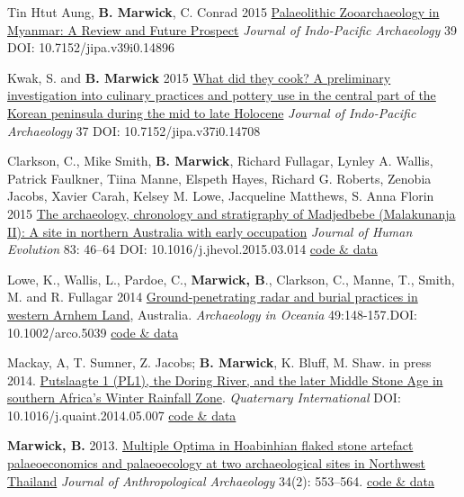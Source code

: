 \documentclass[11pt,article,oneside]{memoir}
\begin{document}
{{{{\ind Tin Htut Aung, \textbf{B. Marwick}, C. Conrad 2015 \href{https://journals.lib.washington.edu/index.php/JIPA/article/view/14896}{Palaeolithic Zooarchaeology in Myanmar: A Review and Future Prospect} \textit{Journal of Indo-Pacific Archaeology} 39 DOI: 10.7152/jipa.v39i0.14896

\ind Kwak, S. and \textbf{B. Marwick} 2015 \href{http://journals.lib.washington.edu/index.php/JIPA/article/view/14708}{What did they cook? A preliminary investigation into culinary practices and pottery use in the central part of the Korean peninsula during the mid to late Holocene} \textit{Journal of Indo-Pacific Archaeology} 37  DOI: 10.7152/jipa.v37i0.14708

\ind Clarkson, C., Mike Smith, \textbf{B. Marwick}, Richard Fullagar, Lynley A. Wallis, Patrick Faulkner, Tiina Manne, Elspeth Hayes, Richard G. Roberts, Zenobia Jacobs, Xavier Carah, Kelsey M. Lowe, Jacqueline Matthews, S. Anna Florin 2015 \href{http://www.sciencedirect.com/science/article/pii/S0047248415000846}{The archaeology, chronology and stratigraphy of Madjedbebe (Malakunanja II): A site in northern Australia with early occupation} \textit{Journal of Human Evolution} 83: 46–64 DOI: 10.1016/j.jhevol.2015.03.014 \href{https://github.com/benmarwick/1989-excavation-report-Madjebebe}{code \& data}

\ind Lowe, K., Wallis, L., Pardoe, C., \textbf{Marwick, B}., Clarkson, C., Manne, T., Smith, M. and R. Fullagar 2014 \href{http://faculty.washington.edu/bmarwick/PDFs/Lowe_et_al_2014_MJB_GPR.pdf}{Ground-penetrating radar and burial practices in western Arnhem Land}, Australia. \textit{Archaeology in Oceania} 49:148-157.\newline  DOI: 10.1002/arco.5039 \href{https://github.com/benmarwick/Rocks-and-burials-at-Madjebebe}{code \& data}

\ind Mackay, A, T. Sumner, Z. Jacobs; \textbf{B. Marwick}, K. Bluff, M. Shaw. in press 2014.  \href{http://faculty.washington.edu/bmarwick/PDFs/Mackay_et_al_2014.pdf}{Putslaagte 1 (PL1), the Doring River, and the later Middle Stone Age in southern Africa's Winter Rainfall Zone}. \textit{Quaternary International} \newline DOI: 10.1016/j.quaint.2014.05.007 \href{https://github.com/benmarwick/Particle-size-analysis-Putslaagte-1}{code \& data}

\ind \textbf{Marwick, B.} 2013. \href{http://faculty.washington.edu/bmarwick/PDFs/Marwick_2013_JAA.pdf}{Multiple Optima in Hoabinhian flaked stone artefact palaeoeconomics and palaeoecology at two archaeological sites in Northwest Thailand} \textit{Journal of Anthropological Archaeology} 34(2): 553–564. \href{http://dx.doi.org/10.6084/m9.figshare.765252}{code \& data}

}}}}
\end{document}
